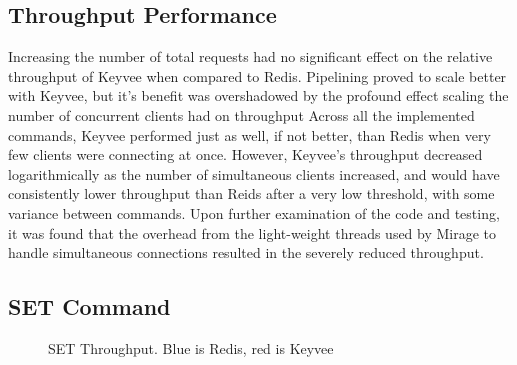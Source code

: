 \documentclass[english,10pt,twocolumn]{article}
\begin{document}
\subsection{Throughput Performance}

Increasing the number of total requests had no significant effect on the relative throughput of Keyvee when compared to Redis.
Pipelining proved to scale better with Keyvee, but it's benefit was overshadowed by the profound effect scaling the number of concurrent clients had on throughput
Across all the implemented commands, Keyvee performed just as well, if not better, than Redis when very few clients were connecting at once.
However, Keyvee's throughput decreased logarithmically as the number of simultaneous clients increased, and would have consistently lower throughput than Reids after a very low threshold, with some variance between commands.
Upon further examination of the code and testing, it was found that the overhead from the light-weight threads used by Mirage to handle simultaneous connections resulted in the severely reduced throughput.

\subsection{SET Command}

\begin{figure}[!htb]
\caption{SET Throughput. Blue is Redis, red is Keyvee}
\end{figure}
\end{document}
